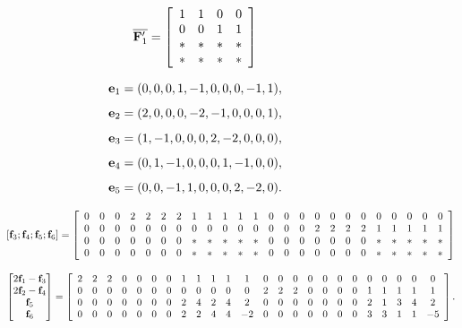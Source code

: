 \documentclass[conference,letterpaper]{IEEEtran}
\begin{document}
\begin{equation} \label{eq:scheme 3 sub sub transmission}
\overline{{\bf F}^{\prime}_1}= \left[
\begin{array}{cccc}
  1 & 1 & 0 & 0  \\
  0 & 0 & 1 & 1 \\
  * & * & * & *  \\
  * & * & * & *
\end{array}
 \right]
\end{equation}

\[
{\bf e}_1 = (0, 0, 0, 1, -1, 0, 0, 0, -1, 1),
\]
\[
{\bf e}_2 = (2, 0, 0, 0, -2, -1, 0, 0, 0, 1),
\]
\[
{\bf e}_3 = (1, -1, 0, 0, 0, 2, -2, 0, 0, 0),
\]
\[
{\bf e}_4 = (0, 1, -1, 0, 0, 0, 1, -1, 0, 0),
\]
\[
{\bf e}_5 = (0, 0, -1, 1, 0, 0, 0, 2, -2, 0).
\]
\begin{figure}
\begin{equation} \label{eq:scheme 3 transmission of second class}
\begin{aligned}
\left[ {{\bf f}}_3 ;  {{\bf f}}_4 ;  {{\bf f}}_5 ;  {{\bf f}}_6 \right] = 
 \left[
\begin{array}{cccccccccccccccccccccccc}
 0 & 0 & 0 &  2 & 2 & 2 & 2 &  1 & 1 & 1 & 1 & 1 & 0 & 0 & 0 & 0 & 0 & 0 & 0 & 0 & 0 & 0 & 0 & 0 \\
 0 & 0 & 0 & 0 & 0 & 0 & 0 & 0 & 0 & 0 & 0 & 0 & 0 & 0 & 0 & 2 & 2 & 2 & 2 & 1 & 1 & 1 & 1 & 1 \\
 0 & 0 & 0 & 0 & 0 & 0 & 0 & * & * & * & * & * & 0 & 0 & 0 & 0 & 0 & 0 & 0 & * & * & * & * & * \\
 0 & 0 & 0 & 0 & 0 & 0 & 0 & * & * & * & * & * & 0 & 0 & 0 & 0 & 0 & 0 & 0 & * & * & * & * & *
\end{array}
 \right]
\end{aligned}
\end{equation}
\end{figure}

\begin{figure} [ht]
\begin{equation} \label{eq:scheme 3 transmission of first class}
\begin{aligned}
\begin{bmatrix}
 2{{\bf f}}_1 - {{\bf f}}_3 \\ 
 2{{\bf f}}_2 - {{\bf f}}_4 \\ 
 {{\bf f}}_5 \\ 
 {{\bf f}}_6 
\end{bmatrix} = 
 \left[
\begin{array}{cccccccccccccccccccccccc}
 2 & 2 & 2 & 0 & 0 & 0 & 0 & 1 & 1 & 1 & 1 & 1 & 0 & 0 & 0 & 0 & 0 & 0 & 0 & 0 & 0 & 0 & 0 & 0 \\
 0 & 0 & 0 & 0 & 0 & 0 & 0 & 0 & 0 & 0 & 0 & 0 & 2 & 2 & 2 & 0 & 0 & 0 & 0 & 1 & 1 & 1 & 1 & 1 \\
 0 & 0 & 0 & 0 & 0 & 0 & 0 & 2 & 4 & 2 & 4 & 2 & 0 & 0 & 0 & 0 & 0 & 0 & 0 & 2 & 1 & 3 & 4 & 2 \\
 0 & 0 & 0 & 0 & 0 & 0 & 0 & 2 & 2 & 4 & 4 & -2 & 0 & 0 & 0 & 0 & 0 & 0 & 0 & 3 & 3 & 1 & 1 & -5
\end{array}
 \right].
\end{aligned}
\end{equation}

\end{figure}
\end{document}
